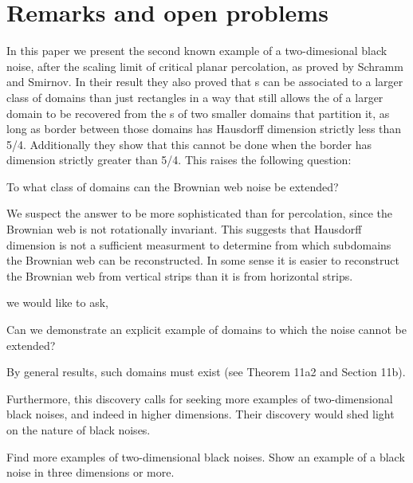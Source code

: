 {
\section{Remarks and open problems}

\label{sec:open-problems}

In this paper we present the second known example of a two-dimesional
black noise, after the scaling limit of critical planar percolation,
as proved by Schramm and Smirnov.  In their result they also proved
that \sigfield{}s can be associated to a larger class of domains than
just rectangles in a way that still allows the \sigfield{} of a larger
domain to be recovered from the \sigfield{}s of two smaller domains
that partition it, as long as border between those domains has
Hausdorff dimension strictly less than 5/4.
Additionally they show that this cannot be done when the border has
dimension strictly greater than 5/4.
This raises the following question:

\begin{openproblem}
  To what class of domains can the Brownian web noise be extended?
\end{openproblem}

We suspect the answer to be more sophisticated than for percolation,
since the Brownian web is not rotationally invariant.  
This suggests that Hausdorff dimension is not a sufficient measurment
to determine from which subdomains the Brownian web can be
reconstructed.  In some sense it is easier to reconstruct the Brownian
web from vertical strips than it is from horizontal strips.

 we would like to ask,

\begin{openproblem}
  Can we demonstrate an explicit example of domains to which the noise
  cannot be extended?
\end{openproblem}

By general results, such domains must exist (see
\cite{tsirelson-nonclassical-stochastic-flows} Theorem 11a2 and
Section 11b).

Furthermore, this discovery calls for seeking more examples of
two-dimen\-sional black noises, and indeed in higher dimensions.  Their
discovery would shed light on the nature of black noises.

\begin{openproblem}
  Find more examples of two-dimensional black noises.  Show an example
  of a black noise in three dimensions or more.
\end{openproblem}
}
